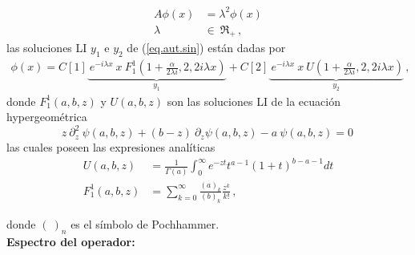 \begin{equation}
\begin{aligned}
    A  \phi (x)  &=   \lambda ^2 \phi (x) \\[5pt]
    \lambda \ &\in \ \mathfrak{R} _+ 
    \, ,
\end{aligned}
\label{eq.aut.sin}
\end{equation}
las soluciones LI $ y_1 $ e $ y_2 $ de (\ref{eq.aut.sin}) están dadas por
\begin{equation}
\begin{aligned}
    \phi (x) =
    C[1]
    \underbrace{
     \ e ^{-i \lambda x} \ x \ F _{1} ^{1} (1+\frac{ \alpha}{2 \lambda i },2,2 i \lambda x) } _ {y_1} + 
      C[2] \underbrace{ \ e^{-i \lambda x } \ x \ U (1+\frac{ \alpha}{2 \lambda i },2,2 i \lambda x) } _{y_2} 
    \, ,
\end{aligned}
\label{eq.phi}
\end{equation}
donde $F _1 ^1(a,b,z)$ y $ U(a,b,z)$ son las soluciones LI de la ecuación hypergeométrica
\begin{equation}
    z \ \partial ^2 _z \ \psi (a,b,z) + (b-z) \
    \partial _z \psi (a,b,z)
    -a \ \psi (a,b,z) = 0 \,
\end{equation}
las cuales poseen las expresiones analíticas 
\begin{equation}
\begin{aligned}
	U(a,b,z) &= \frac{1}{\Gamma (a)} 
	\int _0 ^{\infty} e ^{-zt}
	t ^{a-1}
	(1+t) ^{b-a-1}
	dt \\[5pt]
	F _1 ^1 (a,b,z) &= \sum _ {k=0} ^{\infty} 
	\frac{(a) _k}{(b) _k} 
	\frac{z ^k}{k!} 
	\, ,
\end{aligned}
\end{equation}

donde $( \   ) _n$ es el símbolo de Pochhammer. \\



\textbf{Espectro del operador:} \\

